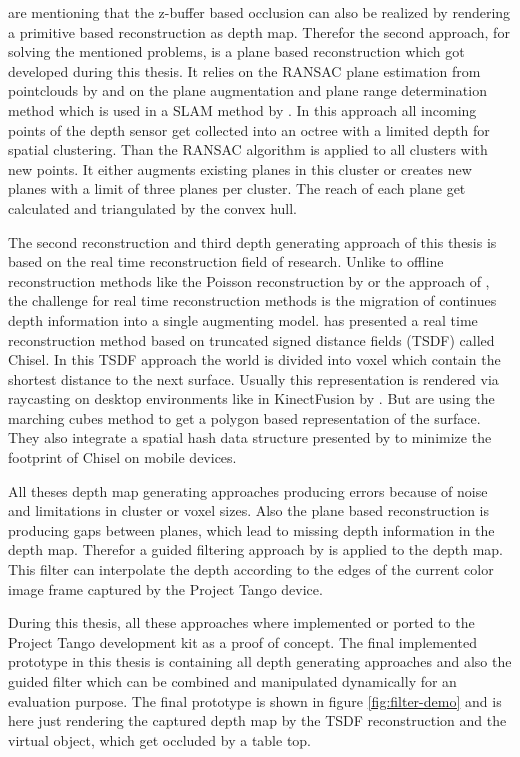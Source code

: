 \documentclass[12pt]{support/thcolognereport}
\begin{document}
\citet{breen1996interactive} are mentioning that the z-buffer based occlusion can also be realized by rendering a primitive based reconstruction as depth map. Therefor the second approach, for solving the mentioned problems, is a plane based reconstruction which got developed during this thesis. It relies on the RANSAC plane estimation from pointclouds by \citet{yang2010plane} and on the plane augmentation and plane range determination method which is used in a SLAM method by \citet{trevor2012planar}. In this approach all incoming points of the depth sensor get collected into an octree with a limited depth for spatial clustering. Than the RANSAC algorithm is applied to all clusters with new points. It either augments existing planes in this cluster or creates new planes with a limit of three planes per cluster. The reach of each plane get calculated and triangulated by the convex hull. 

The second reconstruction and third depth generating approach of this thesis is based on the real time reconstruction field of research. Unlike to offline reconstruction methods like the Poisson reconstruction by \citet{kazhdan2006poisson} or the approach of \citet{hoppe1992surface}, the challenge for real time reconstruction methods is the migration of continues depth information into a single augmenting model. \citet{Klingensmith_2015_7924} has presented a real time reconstruction method based on truncated signed distance fields (TSDF) called Chisel. In this TSDF approach the world is divided into voxel which contain the shortest distance to the next surface. Usually this representation is rendered via raycasting on desktop environments like in KinectFusion by \citet{newcombe2011kinectfusion}. But \citet{Klingensmith_2015_7924} are using the marching cubes method to get a polygon based representation of the surface. They also integrate a spatial hash data structure presented by \citet{niessner2013real} to minimize the footprint of Chisel on mobile devices.

All theses depth map generating approaches producing errors because of noise and limitations in cluster or voxel sizes. Also the plane based reconstruction is producing gaps between planes, which lead to missing depth information in the depth map. Therefor a guided filtering approach by \citet{he2010guided} is applied to the depth map. This filter can interpolate the depth according to the edges of the current color image frame captured by the Project Tango device. 

During this thesis, all these approaches where implemented or ported to the Project Tango development kit as a proof of concept. The final implemented prototype in this thesis is containing all depth generating approaches and also the guided filter which can be combined and manipulated dynamically for an evaluation purpose. The final prototype is shown in figure \ref{fig:filter-demo} and is here just rendering the captured depth map by the TSDF reconstruction and the virtual object, which get occluded by a table top.\\
\end{document}
